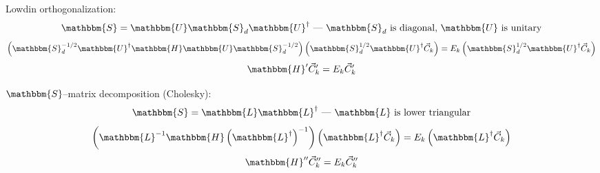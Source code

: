 \begin{frame}{}
\begin{block}{Lowdin orthogonalization:}
$$\mathbbm{S} = \mathbbm{U}\mathbbm{S}_d\mathbbm{U}^{\dagger}\text{ --- $\mathbbm{S}_d$ is diagonal, $\mathbbm{U}$ is unitary}$$
$$\left(\mathbbm{S}_d^{-1/2}\mathbbm{U}^{\dagger}\mathbbm{H}\mathbbm{U}\mathbbm{S}_d^{-1/2}\right)%
   \left(\mathbbm{S}_d^{1/2}\mathbbm{U}^{\dagger}\vec{C}_k\right)=E_k\left(\mathbbm{S}_d^{1/2}\mathbbm{U}^{\dagger}\vec{C}_k\right)$$
$$\mathbbm{H}'\vec{C}_k'=E_k\vec{C}_k'$$
\end{block}
\begin{block}{$\mathbbm{S}$--matrix decomposition (Cholesky):}
$$\mathbbm{S}=\mathbbm{L}\mathbbm{L}^{\dagger}\text{ --- $\mathbbm{L}$ is lower triangular}$$
$$\left(\mathbbm{L}^{-1}\mathbbm{H}\left(\mathbbm{L}^{\dagger}\right)^{-1}\right)\left(\mathbbm{L}^{\dagger}\vec{C}_k\right) = E_k\left(\mathbbm{L}^{\dagger}\vec{C}_k\right)$$
$$\mathbbm{H}''\vec{C}_k''=E_k\vec{C}_k''$$
\end{block}
\end{frame}


